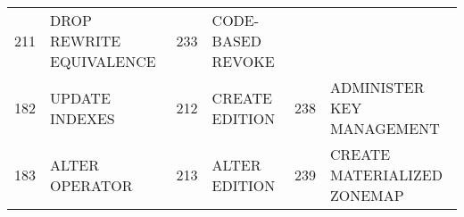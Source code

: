 \begin{longtable}[]{@{}llllll@{}}
\begin{minipage}[t]{0.06\columnwidth}
211\strut
\end{minipage} & \begin{minipage}[t]{0.24\columnwidth}\raggedright\strut
DROP REWRITE EQUIVALENCE\strut
\end{minipage} & \begin{minipage}[t]{0.06\columnwidth}\raggedright\strut
233\strut
\end{minipage} & \begin{minipage}[t]{0.24\columnwidth}\raggedright\strut
CODE-BASED REVOKE\strut
\end{minipage}\tabularnewline
\begin{minipage}[t]{0.06\columnwidth}\raggedright\strut
182\strut
\end{minipage} & \begin{minipage}[t]{0.19\columnwidth}\raggedright\strut
UPDATE INDEXES\strut
\end{minipage} & \begin{minipage}[t]{0.06\columnwidth}\raggedright\strut
212\strut
\end{minipage} & \begin{minipage}[t]{0.24\columnwidth}\raggedright\strut
CREATE EDITION\strut
\end{minipage} & \begin{minipage}[t]{0.06\columnwidth}\raggedright\strut
238\strut
\end{minipage} & \begin{minipage}[t]{0.24\columnwidth}\raggedright\strut
ADMINISTER KEY MANAGEMENT\strut
\end{minipage}\tabularnewline
\begin{minipage}[t]{0.06\columnwidth}\raggedright\strut
183\strut
\end{minipage} & \begin{minipage}[t]{0.19\columnwidth}\raggedright\strut
ALTER OPERATOR\strut
\end{minipage} & \begin{minipage}[t]{0.06\columnwidth}\raggedright\strut
213\strut
\end{minipage} & \begin{minipage}[t]{0.24\columnwidth}\raggedright\strut
ALTER EDITION\strut
\end{minipage} & \begin{minipage}[t]{0.06\columnwidth}\raggedright\strut
239\strut
\end{minipage} & \begin{minipage}[t]{0.24\columnwidth}\raggedright\strut
CREATE MATERIALIZED ZONEMAP\strut

\end{minipage}
\end{longtable}
